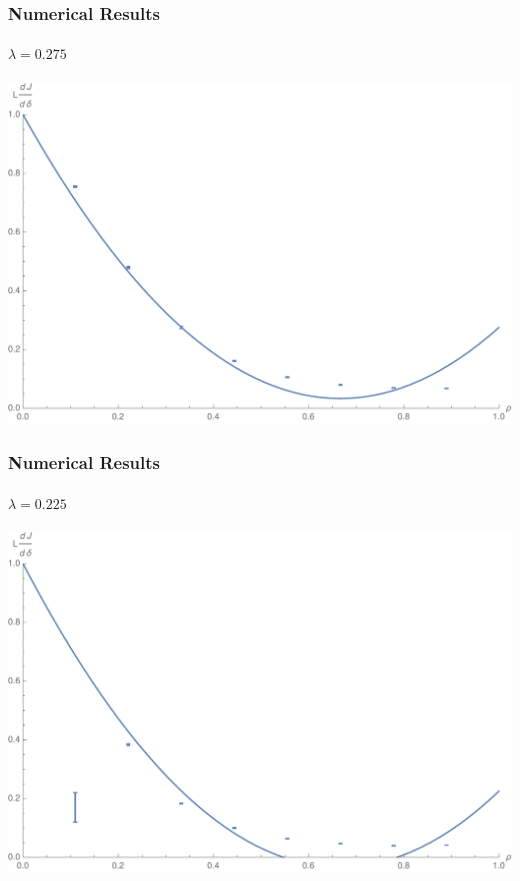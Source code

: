 \documentclass{beamer}
\begin{document}
\begin{frame}
 \frametitle{Numerical Results}
 \framesubtitle{$\lambda = 0.275$}
 \begin{center}
  \includegraphics[width=0.9\linewidth]{images/lambda0p275}
 \end{center}
\end{frame}

\begin{frame}
 \frametitle{Numerical Results}
 \framesubtitle{$\lambda = 0.225$}
 \begin{center}
  \includegraphics[width=0.9\linewidth]{images/lambda0p225}
 \end{center}
\end{frame}
\end{document}
